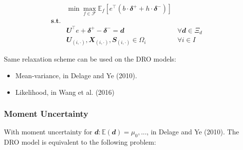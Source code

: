 \documentclass[
  a4paper,
,tablecaptionabove
]{scrartcl}
\numberwithin{equation}{section}
\providecommand{\tightlist}{%
  \setlength{\itemsep}{0pt}\setlength{\parskip}{0pt}}
\begin{document}
\[\begin{aligned}
                  & \min \max_{f\in \mathscr F}\mathbb E_f  \left[e^\top( b \cdot\mathbfit{\delta^+}  + h\cdot \mathbfit \delta^-)\right]                                 \\
    \mathbf{s.t.} &                                                                                                                                                       \\
                  & \mathbfit{U} ^\top e + \mathbfit \delta^+ - \mathbfit \delta^-  = \mathbfit d                                         & \forall \mathbfit d \in \Xi_d \\
                  & \mathbfit U_{(i,\cdot)}, \mathbfit X_{(i,\cdot)}, \mathbfit S_{(i,\cdot)} \in \Omega_i                                & \forall i\in I
  \end{aligned}\]

Same relaxation scheme can be used on the DRO models:

\begin{itemize}
  \tightlist
  \item
        Mean-variance, in Delage and Ye (2010).
  \item
        Likelihood, in Wang et al. (2016)
\end{itemize}

\hypertarget{sec:moment-uncertainty}{%
  \subsubsection{Moment Uncertainty}\label{moment-uncertainty}}

With moment uncertainty for
\(\mathbfit d: \mathbb{E}(\mathbfit d) = \mu_0, ...\), in Delage and
Ye (2010). The DRO model is equivalent to the following problem:
\end{document}

